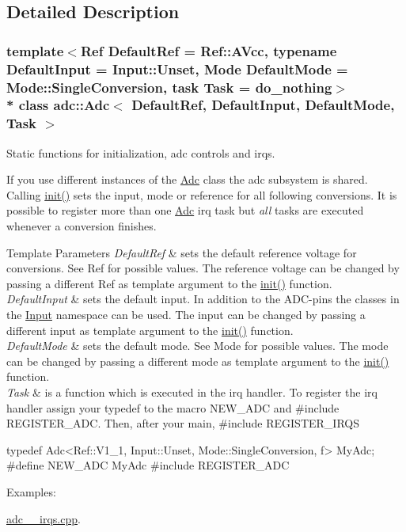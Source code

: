 \subsection{Detailed Description}
\subsubsection*{template$<$Ref Default\+Ref = Ref\+::\+A\+Vcc, typename Default\+Input = Input\+::\+Unset, Mode Default\+Mode = Mode\+::\+Single\+Conversion, task Task = do\+\_\+nothing$>$\\*
class adc\+::\+Adc$<$ Default\+Ref, Default\+Input, Default\+Mode, Task $>$}

Static functions for initialization, adc controls and irqs. 

If you use different instances of the \hyperlink{classadc_1_1Adc}{Adc} class the adc subsystem is shared. Calling \hyperlink{classadc_1_1Adc_ae453bb940554c62082776bd41a9053a3}{init()} sets the input, mode or reference for all following conversions. It is possible to register more than one \hyperlink{classadc_1_1Adc}{Adc} irq task but {\itshape all} tasks are executed whenever a conversion finishes.


\begin{DoxyTemplParams}{Template Parameters}
{\em Default\+Ref} & sets the default reference voltage for conversions. See Ref for possible values. The reference voltage can be changed by passing a different Ref as template argument to the \hyperlink{classadc_1_1Adc_ae453bb940554c62082776bd41a9053a3}{init()} function. \\
\hline
{\em Default\+Input} & sets the default input. In addition to the A\+D\+C-\/pins the classes in the \hyperlink{namespaceadc_1_1Input}{Input} namespace can be used. The input can be changed by passing a different input as template argument to the \hyperlink{classadc_1_1Adc_ae453bb940554c62082776bd41a9053a3}{init()} function. \\
\hline
{\em Default\+Mode} & sets the default mode. See Mode for possible values. The mode can be changed by passing a different mode as template argument to the \hyperlink{classadc_1_1Adc_ae453bb940554c62082776bd41a9053a3}{init()} function. \\
\hline
{\em Task} & is a function which is executed in the irq handler. To register the irq handler assign your typedef to the macro {\ttfamily N\+E\+W\+\_\+\+A\+DC} and {\ttfamily \#include R\+E\+G\+I\+S\+T\+E\+R\+\_\+\+A\+DC}. Then, after your main, {\ttfamily \#include R\+E\+G\+I\+S\+T\+E\+R\+\_\+\+I\+R\+QS}\\
\hline
\end{DoxyTemplParams}
\begin{DoxyVerb}typedef Adc<Ref::V1_1, Input::Unset, Mode::SingleConversion, f> MyAdc;
#define NEW_ADC MyAdc
#include REGISTER_ADC\end{DoxyVerb}
 \begin{Desc}
\item[Examples\+: ]\par
\hyperlink{adc_2_irqs_8cpp-example}{adc\+\_\+\_\+irqs.\+cpp}.\end{Desc}



